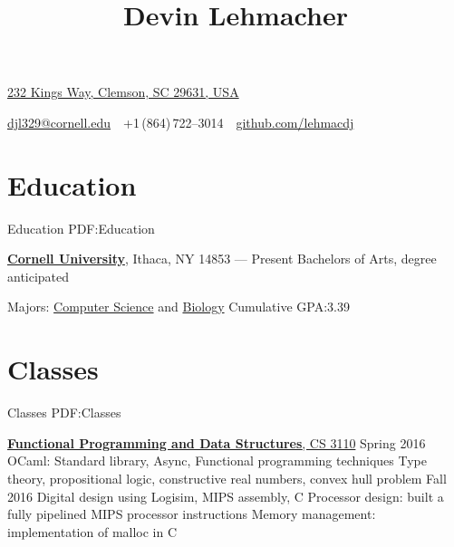 \documentclass[letterpaper,10pt,oneside]{simpleresumecv}
\newcommand{\CVAuthor}{Devin Lehmacher}
\newcommand{\CVWebpage}{github.com/lehmacdj}
\begin{document}

\title{\CVAuthor}

\begin{subtitle}
\href{https://www.google.com/maps/place/232+Kings+Way,+Clemson,+SC+29631,+USA}
{232 Kings Way, Clemson, SC 29631, USA}
\par
\href{mailto:djl329@cornell.edu}
{djl329@cornell.edu}
\,\SubBulletSymbol\,
+1\,(864)\,722--3014
\,\SubBulletSymbol\,
\href{https://\CVWebpage}
{\CVWebpage}
\end{subtitle}

\begin{body}


\section%
{Education}
{Education}
{PDF:Education}

\href{https://www.cornell.edu}
{\textbf{Cornell University}},
Ithaca, NY 14853
\hfill
{} --- Present
\BulletItem%
Bachelors of Arts, degree anticipated
\begin{detail}
\SubBulletItem%
Majors:
\href{https://www.cs.cornell.edu}
{Computer Science}
and
\href{https://www.biology.cornell.edu}
{Biology}
\SubBulletItem%
Cumulative GPA:\@ 3.39
\end{detail}


\section%
{Classes}
{Classes}
{PDF:Classes}

\href{https://www.cs.cornell.edu/courses/cs3110/2016sp/}
{\textbf{Functional Programming and Data Structures}, CS 3110}
\hfill Spring 2016
\BulletItem%
OCaml: Standard library, Async, Functional programming techniques
\BulletItem%
Type theory, propositional logic, constructive real numbers, convex hull problem
\hfill Fall 2016
\BulletItem%
Digital design using Logisim, MIPS assembly, C
\BulletItem%
Processor design: built a fully pipelined MIPS processor
instructions
\BulletItem%
Memory management: implementation of malloc in C
\GapNoBreak%


\end{body}
\end{document}
